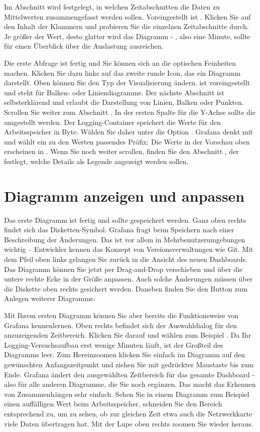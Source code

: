 Im Abschnitt  wird festgelegt, in welchen Zeitabschnitten die Daten zu Mittelwerten zusammengefasst werden sollen. Voreingestellt ist . Klicken Sie auf den Inhalt der Klammern und probieren Sie die einzelnen Zeitabschnitte durch. Je größer der Wert, desto glatter wird das Diagramm - , also eine Minute, sollte für einen Überblick über die Auslastung ausreichen.

Die erste Abfrage ist fertig und Sie können sich an die optischen Feinheiten machen. Klicken Sie dazu links auf das zweite runde Icon, das ein Diagramm darstellt. Oben können Sie den Typ der Visualisierung ändern.  ist voreingestellt und steht für Balken- oder Liniendiagramme. Der nächste Abschnitt ist selbsterklärend und erlaubt die Darstellung von Linien, Balken oder Punkten. Scrollen Sie weiter zum Abschnitt . In der ersten Spalte  für die Y-Achse sollte die  umgestellt werden. Der Logging-Container speichert die Werte für den Arbeitsspeicher in Byte. Wählen Sie daher unter  die Option . Grafana denkt mit und wählt ein zu den Werten passendes Präfix: Die Werte in der Vorschau oben erscheinen in . Wenn Sie noch weiter scrollen, finden Sie den Abschnitt , der festlegt, welche Details als Legende angezeigt werden sollen.

\section{Diagramm anzeigen und anpassen}

Das erste Diagramm ist fertig und sollte gespeichert werden. Ganz oben rechts findet sich das Disketten-Symbol. Grafana fragt beim Speichern nach einer Beschreibung der Änderungen. Das ist vor allem in Mehrbenutzerumgebungen wichtig – Entwickler kennen das Konzept von Versionsverwaltungen wie Git. Mit dem Pfeil oben links gelangen Sie zurück in die Ansicht des neuen Dashboards. Das Diagramm können Sie jetzt per Drag-and-Drop verschieben und über die untere rechte Ecke in der Größe anpassen. Auch solche Änderungen müssen über die Diskette oben rechts gesichert werden. Daneben finden Sie den Button zum Anlegen weiterer Diagramme.

Mit Ihrem ersten Diagramm können Sie aber bereits die Funktionsweise von Grafana kennenlernen. Oben rechts befindet sich der Auswahldialog für den anzuzeigenden Zeitbereich. Klicken Sie darauf und wählen zum Beispiel . Da Ihr Logging-Versuchsaufbau erst wenige Minuten läuft, ist der Großteil des Diagramms leer. Zum Hereinzoomen klicken Sie einfach im Diagramm auf den gewünschten Anfangszeitpunkt und ziehen Sie mit gedrückter Maustaste bis zum Ende. Grafana ändert den ausgewählten Zeitbereich für das gesamte Dashboard - also für alle anderen Diagramme, die Sie noch ergänzen. Das macht das Erkennen von Zusammenhängen sehr einfach. Sehen Sie in einem Diagramm zum Beispiel einen auffälligen Wert beim Arbeitsspeicher, schneiden Sie den Bereich entsprechend zu, um zu sehen, ob zur gleichen Zeit etwa auch die Netzwerkkarte viele Daten übertragen hat. Mit der Lupe oben rechts zoomen Sie wieder heraus.

